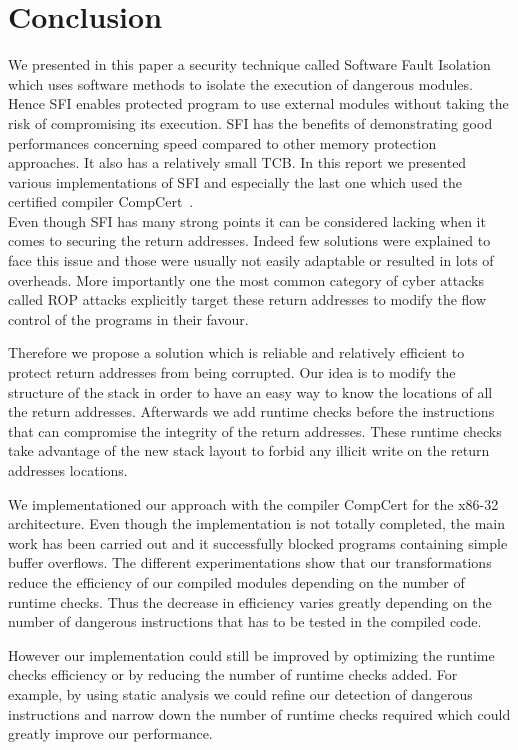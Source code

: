 \documentclass[11pt]{sdm}
\begin{document}
\section{Conclusion}
\label{sec:Conclusion}
We presented in this paper a security technique called Software Fault Isolation which uses software methods to isolate the execution of dangerous modules. Hence SFI enables protected program to use external modules without taking the risk of compromising its execution. SFI has the benefits of demonstrating good performances concerning speed compared to other memory protection approaches. It also has a relatively small TCB. In this report we presented various implementations of SFI and especially the last one which used the certified compiler CompCert~\cite{Kroll:2014:PSF:2708449.2708686}. \\
Even though SFI has many strong points it can be considered lacking when it comes to securing the return addresses. Indeed few solutions were explained to face this issue and those were usually not easily adaptable or resulted in lots of overheads. More importantly one the most common category of cyber attacks called ROP attacks explicitly target these return addresses to modify the flow control of the programs in their favour.

Therefore we propose a solution which is reliable and relatively efficient to protect return addresses from being corrupted. Our idea is to modify the structure of the stack in order to have an easy way to know the locations of all the return addresses. Afterwards we add runtime checks before the instructions that can compromise the integrity of the return addresses. These runtime checks take advantage of the new stack layout to forbid any illicit write on the return addresses locations.

We implementationed our approach with the compiler CompCert for the x86-32 architecture. Even though the implementation is not totally completed, the main work has been carried out and it successfully blocked programs containing simple buffer overflows. The different experimentations show that our transformations reduce the efficiency of our compiled modules depending on the number of runtime checks. Thus the decrease in efficiency varies greatly depending on the number of dangerous instructions that has to be tested in the compiled code.


However our implementation could still be improved by optimizing the runtime checks efficiency or by reducing the number of runtime checks added. For example, by using static analysis we could refine our detection of dangerous instructions and narrow down the number of runtime checks required which could greatly improve our performance.


\newpage


\end{document}
